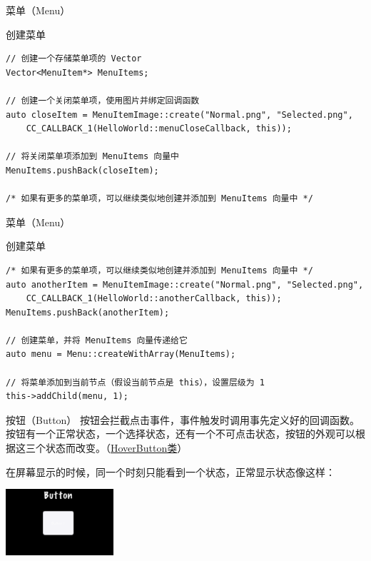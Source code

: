 \documentclass{beamer}
\newcommand{\hrefcol}[2]{\textcolor{cyan}{\href{#1}{#2}}}
\begin{document}

\begin{frame}[fragile]{菜单（Menu）}
\begin{block}{创建菜单}
\begin{verbatim}
// 创建一个存储菜单项的 Vector
Vector<MenuItem*> MenuItems;

// 创建一个关闭菜单项，使用图片并绑定回调函数
auto closeItem = MenuItemImage::create("Normal.png", "Selected.png",
    CC_CALLBACK_1(HelloWorld::menuCloseCallback, this));

// 将关闭菜单项添加到 MenuItems 向量中
MenuItems.pushBack(closeItem);

/* 如果有更多的菜单项，可以继续类似地创建并添加到 MenuItems 向量中 */
\end{verbatim}
\end{block}
\end{frame}


\begin{frame}[fragile]{菜单（Menu）}
\begin{block}{创建菜单}
\begin{verbatim}
/* 如果有更多的菜单项，可以继续类似地创建并添加到 MenuItems 向量中 */
auto anotherItem = MenuItemImage::create("Normal.png", "Selected.png",
    CC_CALLBACK_1(HelloWorld::anotherCallback, this));
MenuItems.pushBack(anotherItem);

// 创建菜单，并将 MenuItems 向量传递给它
auto menu = Menu::createWithArray(MenuItems);

// 将菜单添加到当前节点（假设当前节点是 this），设置层级为 1
this->addChild(menu, 1);
\end{verbatim}
\end{block}
\end{frame}


\begin{frame}[fragile]{按钮（Button）}
按钮会拦截点击事件，事件触发时调用事先定义好的回调函数。按钮有一个正常状态，一个选择状态，还有一个不可点击状态，按钮的外观可以根据这三个状态而改变。（\hrefcol{https://github.com/MinmusLin/Teamfight_Tactics/blob/main/Classes/Button}{HoverButton类}）

\vspace{1em}

在屏幕显示的时候，同一个时刻只能看到一个状态，正常显示状态像这样：

\vspace{1em}

\includegraphics[width=0.3\textwidth]
{figures/button}
\end{frame}
\end{document}
